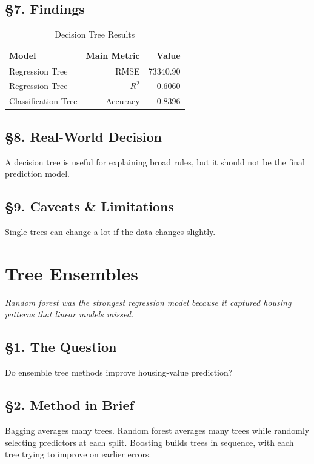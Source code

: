 \documentclass[12pt]{report}
\begin{document}
\section*{\S7. Findings}

\begin{table}[H]
\centering
\caption{Decision Tree Results}
\begin{tabular}{lrr}
\toprule
Model & Main Metric & Value \\
\midrule
Regression Tree & RMSE & 73340.90 \\
Regression Tree & $R^2$ & 0.6060 \\
Classification Tree & Accuracy & 0.8396 \\
\bottomrule
\end{tabular}
\end{table}

\section*{\S8. Real-World Decision}
A decision tree is useful for explaining broad rules, but it should not be the final prediction model.

\section*{\S9. Caveats \& Limitations}
Single trees can change a lot if the data changes slightly.

\newpage

\chapter{Tree Ensembles}

\begin{center}
\textit{Random forest was the strongest regression model because it captured housing patterns that linear models missed.}
\end{center}

\section*{\S1. The Question}
Do ensemble tree methods improve housing-value prediction?

\section*{\S2. Method in Brief}
Bagging averages many trees. Random forest averages many trees while randomly selecting predictors at each split. Boosting builds trees in sequence, with each tree trying to improve on earlier errors.
\end{document}
